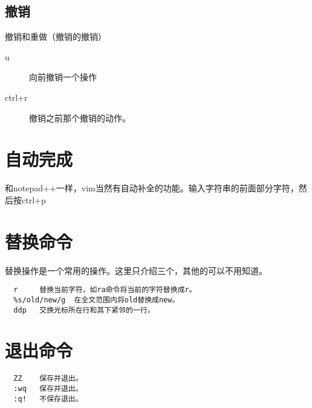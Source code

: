 \documentclass[a4paper,12pt]{ctexart}%
\begin{document}
\subsection{撤销}
撤销和重做（撤销的撤销）
\begin{description}
  \item[u] 向前撤销一个操作
  \item[ctrl+r] 撤销之前那个撤销的动作。
\end{description}

\section{自动完成}
和notepad++一样，vim当然有自动补全的功能。输入字符串的前面部分字符，然后按ctrl+p

\section{替换命令}
替换操作是一个常用的操作。这里只介绍三个，其他的可以不用知道。
\begin{verbatim}
  r     替换当前字符，如ra命令将当前的字符替换成r。
  %s/old/new/g  在全文范围内将old替换成new。
  ddp   交换光标所在行和其下紧邻的一行。
\end{verbatim}









\section{退出命令}
\begin{verbatim}
  ZZ    保存并退出。
  :wq   保存并退出。
  :q!   不保存退出。
\end{verbatim}
\end{document}
